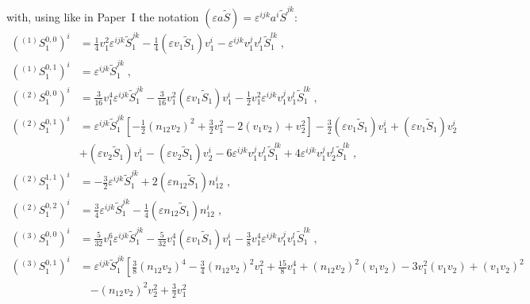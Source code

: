 \documentclass[
superscriptaddress,
preprint,
prd,tightenlines,showpacs,nofootinbib,
eqsecnum,
amsfonts,amsmath,amssymb]{revtex4-1}
\begin{document}
%
with, using like in Paper~I the notation $(\varepsilon a \tilde{S}) =
\varepsilon^{ijk}a^{i}\tilde{S}^{jk}$: 
%
\begin{align}
  \left({}^{(1)}S_{1}^{0,0}\right)^{i} &=
  \frac{1}{4} v_{1}^{2} \varepsilon^{ijk}\tilde{S}_{1}^{jk} - \frac{1}{4} (\varepsilon{}v_{1}\tilde{S}_{1})v_{1}^{i} - \varepsilon^{ijk}v_{1}^{j}v_{1}^{l}\tilde{S}_{1}^{lk} \;,\nonumber \\
  \left({}^{(1)}S_{1}^{0,1}\right)^{i} &=
  \varepsilon^{ijk}\tilde{S}_{1}^{jk} \;,\nonumber \\
  \left({}^{(2)}S_{1}^{0,0}\right)^{i} &= \frac{3}{16} v_{1}^{4}
  \varepsilon^{ijk}\tilde{S}_{1}^{jk} - \frac{3}{16} v_{1}^{2}
  (\varepsilon{}v_{1}\tilde{S}_{1})v_{1}^{i} - \frac{1}{2} v_{1}^{2}
  \varepsilon^{ijk}v_{1}^{j}v_{1}^{l}
  \tilde{S}_{1}^{lk} \;,\nonumber \\
  \left({}^{(2)}S_{1}^{0,1}\right)^{i} &= \varepsilon^{ijk}
  \tilde{S}_{1}^{jk} \left[ -\frac{1}{2} (n_{12}v_{2})^2 +
    \frac{3}{2} v_{1}^{2} - 2 (v_{1}v_{2}) + v_{2}^{2} \right] - \frac{3}{2} (\varepsilon{}v_{1}\tilde{S}_{1})v_{1}^{i} + (\varepsilon{}v_{1}\tilde{S}_{1})v_{2}^{i} \nonumber \\
  & + (\varepsilon{}v_{2}\tilde{S}_{1})v_{1}^{i} - (\varepsilon{}v_{2}\tilde{S}_{1})v_{2}^{i} - 6 \varepsilon^{ijk}v_{1}^{j}v_{1}^{l}\tilde{S}_{1}^{lk} + 4 \varepsilon^{ijk}v_{1}^{j}v_{2}^{l}\tilde{S}_{1}^{lk} \;,\nonumber \\
  \left({}^{(2)}S_{1}^{1,1}\right)^{i} &= -
  \frac{3}{2} \varepsilon^{ijk}\tilde{S}_{1}^{jk} + 2 (\varepsilon{}n_{12}\tilde{S}_{1})n_{12}^{i} \;,\nonumber \\
  \left({}^{(2)}S_{1}^{0,2}\right)^{i} &=
  \frac{3}{4} \varepsilon^{ijk}\tilde{S}_{1}^{jk} - \frac{1}{4} (\varepsilon{}n_{12}\tilde{S}_{1})n_{12}^{i} \;,\nonumber \\
  \left({}^{(3)}S_{1}^{0,0}\right)^{i} &=
  \frac{5}{32} v_{1}^{6} \varepsilon^{ijk}\tilde{S}_{1}^{jk} - \frac{5}{32} v_{1}^{4} (\varepsilon{}v_{1}\tilde{S}_{1})v_{1}^{i} - \frac{3}{8} v_{1}^{4} \varepsilon^{ijk}v_{1}^{j}v_{1}^{l}\tilde{S}_{1}^{lk} \;,\nonumber \\
  \left({}^{(3)}S_{1}^{0,1}\right)^{i} &=
  \varepsilon^{ijk}\tilde{S}_{1}^{jk} \left[ \frac{3}{8}
    (n_{12}v_{2})^4 - \frac{3}{4} (n_{12}v_{2})^2 v_{1}^{2} +
    \frac{15}{8} v_{1}^{4} + (n_{12}v_{2})^2 (v_{1}v_{2}) - 3
    v_{1}^{2} (v_{1}v_{2}) +
    (v_{1}v_{2})^2 \right. \nonumber \\
  & \quad \left. - (n_{12}v_{2})^2 v_{2}^{2} + \frac{3}{2} v_{1}^{2}

\end{align}
\end{document}
